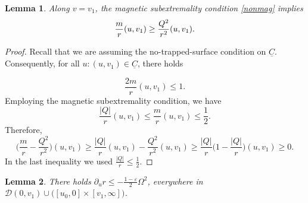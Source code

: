 \documentclass{article}[11pt]
\newcommand{\Cbar}{\underline{C}}
\newcommand{\be}{\begin{equation}}
\newcommand{\ee}{\end{equation}}
\newtheorem{lemma}{Lemma}[section]
\numberwithin{equation}{section}
\begin{document}
\begin{lemma}
Along $v=v_1$, the magnetic subextremality condition \eqref{nonmag} implies \be \notag \frac{m}{r}(u,v_1)\geq \frac{Q^2}{r^2}(u,v_1). \ee
\end{lemma}

\begin{proof}
   Recall that we are assuming the no-trapped-surface condition on $\Cbar$. Consequently, for all $u: (u,v_1) \in \Cbar$, there holds

   \[  \frac{2m}{r}(u,v_1)\leq 1.    \]Employing the magnetic subextremality condition, we have \[ \frac{\lvert Q \rvert}{r}(u,v_1)\leq \frac{m}{r}(u,v_1)\leq \frac{1}{2}.   \]Therefore, \[ \big( \frac{m}{r}-\frac{Q^2}{r^2}\big)(u,v_1) \geq \frac{\lvert Q\rvert}{r}(u,v_1) - \frac{Q^2
   }{r^2}(u,v_1) \geq \frac{\lvert Q \rvert}{r}\big( 1 - \frac{\lvert Q \rvert}{r}\big)(u,v_1) \geq 0.    \]In the last inequality we used $\frac{\lvert Q \rvert}{r}\leq \frac{1}{2}$.
\end{proof}

\begin{lemma}
There holds $\partial_u r \leq -\frac{1-\varepsilon}{2}\Omega^2$, everywhere in $\mathcal{D}(0,v_1)\cup\big( [u_0,0]\times [v_1,\infty]\big)$.
\end{lemma}
\end{document}

